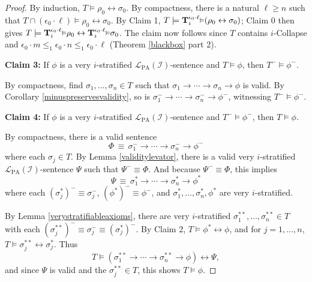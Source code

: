 \documentclass[reqno]{article}
\theoremstyle{definition}
\def\L{\mathscr{L}}
\def\T{\mathbf{T}}
\def\LPA{\L_{\mathrm{PA}}}
\def\indset{\mathcal I}
\newcommand{\Prr}[2]{\T^{#1}_{#2}\mbox{\small${\vDash}$}}
\newcommand{\claim}[1]{\textbf{Claim #1:}}
\begin{document}
\begin{proof}
By induction, $T\models\rho_0\leftrightarrow\sigma_0$.
By compactness, there is a natural $\ell\geq n$
such that $T\cap 
(\epsilon_0\cdot\ell)\models\rho_0\leftrightarrow\sigma_0$.
By Claim 1, $T\models 
\Prr{\epsilon_0\cdot\ell}i(\rho_0\leftrightarrow\sigma_0)$;
Claim 0 then gives $T\models \Prr{\epsilon_0\cdot\ell}i\rho_0
\leftrightarrow \Prr{\epsilon_0\cdot\ell}i\sigma_0$.
The claim now follows since $T$ contains $i$-Collapse
and $\epsilon_0\cdot m\leq_1\epsilon_0\cdot n\leq_1 \epsilon_0\cdot \ell$ (Theorem \ref{blackbox} part 2).

\item
\claim3
If $\phi$ is a very $i$-stratified $\LPA(\indset)$-sentence
and $T\models\phi$, then $T^-\models\phi^-$.

\item
By compactness, find 
$\sigma_1,\ldots,\sigma_n\in T$ such that
$\sigma_1\rightarrow\cdots\rightarrow\sigma_n\rightarrow\phi$
is valid.
By Corollary \ref{minuspreservesvalidity},
so is $\sigma^-_1\rightarrow\cdots\rightarrow\sigma^-_n\rightarrow\phi^-$,
witnessing $T^-\models\phi^-$.

\item
\claim4
If $\phi$ is a very $i$-stratified $\LPA(\indset)$-sentence
and $T^-\models\phi^-$, then $T\models\phi$.

\item
By compactness,
there is a valid sentence
\[
\Phi\,\equiv\,\sigma^-_1\rightarrow\cdots\rightarrow\sigma^-_n\rightarrow\phi^-\]
where each $\sigma_j\in T$.
By Lemma \ref{validitylevator},
there is a valid very $i$-stratified $\LPA(\indset)$-sentence $\Psi$
such that $\Psi^-\equiv\Phi$.
And because $\Psi^-\equiv\Phi$, this implies
\[
\Psi\,\equiv\,\sigma^*_1\rightarrow\cdots\rightarrow\sigma^*_n\rightarrow\phi^*
\]
where each $(\sigma^*_j)^-\equiv\sigma^-_j$, $(\phi^*)^-\equiv\phi^-$,
and $\sigma^*_1,\ldots,\sigma^*_n,\phi^*$ are very $i$-stratified.

By Lemma \ref{verystratifiableaxioms},
there are very $i$-stratified
$\sigma^{**}_1,\ldots,\sigma^{**}_n\in T$ with each $(\sigma^{**}_j)^-\equiv \sigma^-_j\equiv (\sigma^*_j)^-$.
By Claim 2, $T\models\phi^*\leftrightarrow\phi$, and for $j=1,\ldots,n$, $T\models \sigma^{**}_j\leftrightarrow \sigma^*_j$.
Thus
\[
T\models (\sigma^{**}_1\rightarrow\cdots\rightarrow\sigma^{**}_n\rightarrow\phi)\leftrightarrow\Psi,
\]
and since $\Psi$ is valid and the $\sigma^{**}_j\in T$, this shows $T\models\phi$.
\end{proof}
\end{document}
